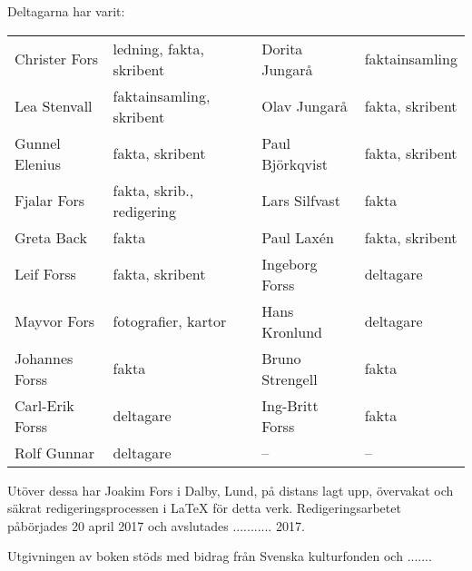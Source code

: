 Deltagarna har varit:
\begin{center}
  \begin{tabular}{l l l l}
    Christer Fors & ledning, fakta, skribent & Dorita Jungarå & faktainsamling \\
    Lea Stenvall & faktainsamling, skribent & Olav Jungarå & fakta, skribent \\
    Gunnel Elenius & fakta, skribent & Paul Björkqvist & fakta, skribent \\
    Fjalar Fors & fakta, skrib., redigering & Lars Silfvast & fakta \\
    Greta Back & fakta & Paul Laxén & fakta, skribent \\
    Leif Forss & fakta, skribent & Ingeborg Forss & deltagare \\
    Mayvor Fors & fotografier, kartor & Hans Kronlund & deltagare \\
    Johannes Forss & fakta & Bruno Strengell & fakta \\
    Carl-Erik Forss & deltagare & Ing-Britt Forss & fakta \\
    Rolf Gunnar & deltagare & -- & -- \\
  \end{tabular}
\end{center}
Utöver dessa har Joakim Fors i Dalby, Lund, på distans lagt upp, övervakat och säkrat redigeringsprocessen i LaTeX för detta verk. Redigeringsarbetet påbörjades 20 april 2017 och avslutades ........... 2017.

Utgivningen av boken stöds med bidrag från Svenska kulturfonden och .......
